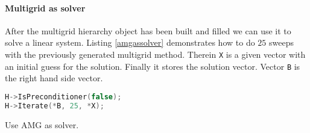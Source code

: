 \documentclass[12pt,a4paper]{article}
\begin{document}
\paragraph{Multigrid as solver}
After the multigrid hierarchy object has been built and filled we can use it to solve a linear system.
Listing \ref{amgassolver} demonstrates how to do $25$ sweeps with the previously generated multigrid method. Therein \verb|X| is a given vector with an initial guess for the solution. Finally it stores the solution vector. Vector \verb|B| is the right hand side vector.
\begin{Listing} 
\begin{center} 
\begin{lstlisting}[language=C++,label=listing:AmgAsSolver]
H->IsPreconditioner(false);
H->Iterate(*B, 25, *X);
\end{lstlisting}
\caption{Use AMG as solver.} 
\label{listing:amgassolver}
\end{center}
\end{Listing}
\end{document}
